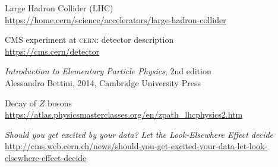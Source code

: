 \begin{thebibliography}{99}
Large Hadron Collider (LHC)
\\\url{https://home.cern/science/accelerators/large-hadron-collider}

CMS experiment at \textsc{cern}: detector description
\\\url{https://cms.cern/detector}

\textit{Introduction to Elementary Particle Physics}, 2nd edition
\\Alessandro Bettini, 2014, Cambridge University Press

Decay of $Z$ bosons
\\\url{https://atlas.physicsmasterclasses.org/en/zpath_lhcphysics2.htm}

\textit{Should you get excited by your data? Let the Look-Elsewhere Effect decide}
\\\url{http://cms.web.cern.ch/news/should-you-get-excited-your-data-let-look-elsewhere-effect-decide}
\end{thebibliography}